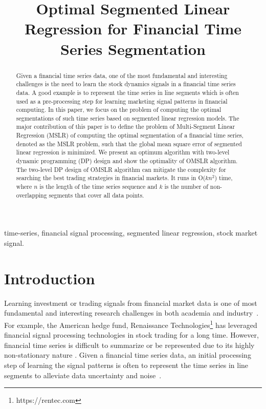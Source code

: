 \documentclass{article}
\title{Optimal Segmented Linear Regression for Financial Time Series Segmentation}
\begin{document}
%
\maketitle
%
\begin{abstract}
Given a financial time series data, one of the most fundamental and interesting challenges is the need to learn the stock dynamics signals in a financial time series data. A good example is to represent the time series in line segments which is often used as a pre-processing step for learning marketing signal patterns in financial computing. In this paper, we focus on the problem of computing the optimal segmentations of such time series based on segmented linear regression models. The major contribution of this paper is to define the problem of Multi-Segment Linear Regression (MSLR) of computing the optimal segmentation of a financial time series, denoted as the MSLR problem, such that the global mean square error of segmented linear regression is minimized. We present an optimum algorithm with two-level dynamic programming (DP) design and show the optimality of OMSLR algorithm. The two-level DP design of OMSLR algorithm can mitigate the complexity for searching the best trading strategies in financial markets. It runs in O($kn^2$) time, where $n$ is the length of the time series sequence and $k$ is the number of non-overlapping segments that cover all data points.
\end{abstract}
%
\begin{keywords}
time-series, financial signal processing, segmented linear regression, stock market signal.
\end{keywords}
%
\section{Introduction}
\label{sec:intro}
Learning investment or trading signals from financial market data is one of most fundamental and interesting research challenges in both academia and industry~\cite{Murphy1999,Akansu2016}. For example, the American hedge fund, Renaissance Technologies\footnote{https://rentec.com} has leveraged financial signal processing technologies in stock trading for a long time. However, financial time series is difficult to summarize or be represented due to its highly non-stationary nature \cite{AbuMostafa2004}. Given a financial time series data, an initial processing step of learning the signal patterns is often to represent the time series in line segments to alleviate data uncertainty and noise~\cite{Lavrenko2000}.
\end{document}
